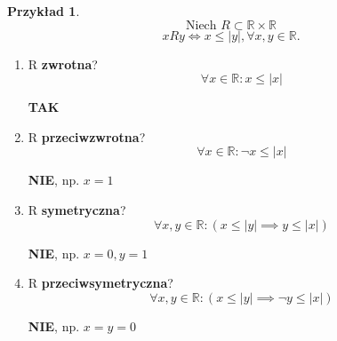 \documentclass[a5paper,8pt]{article}
\theoremstyle{mythmstyle}
\newtheorem*{example}{Przykład}
\begin{document}
            \pagebreak
            \begin{example}
                \begin{equation*}
                    \text{Niech   } R \subset \mathbb{R} \times \mathbb{R}
                \end{equation*}
                \begin{equation*}
                    x R y \iff x \leq |y|, \forall x, y \in \mathbb{R}.
                \end{equation*}
            \end{example}

            \begin{enumerate}
                \item R \textbf{zwrotna}?
                    \begin{equation*}
                        \forall x \in \mathbb{R}: x \leq |x|
                    \end{equation*}
                    \begin{center}
                        \textbf{TAK}
                    \end{center}

                \item R \textbf{przeciwzwrotna}?
                    \begin{equation*}
                        \forall x \in \mathbb{R}: \neg x \leq |x|
                    \end{equation*}
                    \begin{center}
                        \textbf{NIE}, np. $ x = 1 $
                    \end{center}

                \item R \textbf{symetryczna}?
                    \begin{equation*}
                        \forall x, y \in \mathbb{R}: ( x \leq |y| \implies y \leq |x| )
                    \end{equation*}
                    \begin{center}
                        \textbf{NIE}, np. $ x = 0, y = 1 $
                    \end{center}

                \item R \textbf{przeciwsymetryczna}?
                    \begin{equation*}
                        \forall x, y \in \mathbb{R}: ( x \leq |y| \implies \neg y \leq |x| )
                    \end{equation*}
                    \begin{center}
                        \textbf{NIE}, np. $ x = y = 0 $
                    \end{center}


\end{enumerate}
\end{document}
